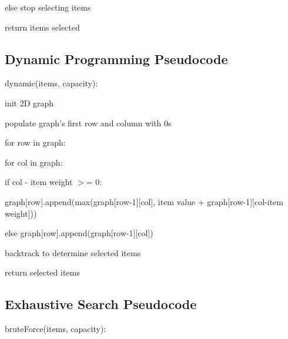 \documentclass{article}
\begin{document}
\hspace{\parindent}\hspace{\parindent}else stop selecting items

\hspace{\parindent}return items selected

\subsection{Dynamic Programming Pseudocode}
\hspace{\parindent}dynamic(items, capacity):

\hspace{\parindent}init 2D graph

\hspace{\parindent}populate graph's first row and column with 0s

\hspace{\parindent}for row in graph:

\hspace{\parindent}\hspace{\parindent}for col in graph:

\hspace{\parindent}\hspace{\parindent}\hspace{\parindent}if col - item weight $>$= 0:

\hspace{\parindent}\hspace{\parindent}\hspace{\parindent}\hspace{\parindent}graph[row].append(max(graph[row-1][col], item value + graph[row-1][col-item weight]))

\hspace{\parindent}\hspace{\parindent}\hspace{\parindent}else graph[row].append(graph[row-1][col])

\hspace{\parindent}backtrack to determine selected items

\hspace{\parindent}return selected items

\subsection{Exhaustive Search Pseudocode}
\hspace{\parindent}bruteForce(items, capacity):
\end{document}
